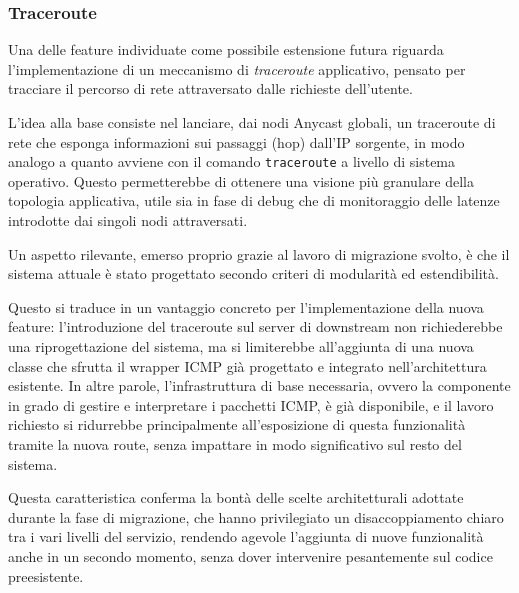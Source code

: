 \subsubsection{Traceroute}
Una delle feature individuate come possibile estensione futura riguarda l'implementazione di un meccanismo di \emph{traceroute} applicativo, pensato per tracciare il percorso di rete attraversato dalle richieste dell'utente.

L'idea alla base consiste nel lanciare, dai nodi Anycast globali, un traceroute di rete che esponga informazioni sui passaggi (hop) dall'\ac{IP} sorgente, in modo analogo a quanto avviene con il comando \texttt{traceroute} a livello di sistema operativo.
Questo permetterebbe di ottenere una visione più granulare della topologia applicativa, utile sia in fase di debug che di monitoraggio delle latenze introdotte dai singoli nodi attraversati.

Un aspetto rilevante, emerso proprio grazie al lavoro di migrazione svolto, è che il sistema attuale è stato progettato secondo criteri di modularità ed estendibilità.

Questo si traduce in un vantaggio concreto per l'implementazione della nuova feature: l'introduzione del traceroute sul server di downstream non richiederebbe una riprogettazione del sistema, ma si limiterebbe all'aggiunta di una nuova classe che sfrutta il wrapper \ac{ICMP} già progettato e integrato nell'architettura esistente. In altre parole, l'infrastruttura di base necessaria, ovvero la componente in grado di gestire e interpretare i pacchetti \ac{ICMP}, è già disponibile, e il lavoro richiesto si ridurrebbe principalmente all'esposizione di questa funzionalità tramite la nuova route, senza impattare in modo significativo sul resto del sistema.

Questa caratteristica conferma la bontà delle scelte architetturali adottate durante la fase di migrazione, che hanno privilegiato un disaccoppiamento chiaro tra i vari livelli del servizio, rendendo agevole l'aggiunta di nuove funzionalità anche in un secondo momento, senza dover intervenire pesantemente sul codice preesistente.
